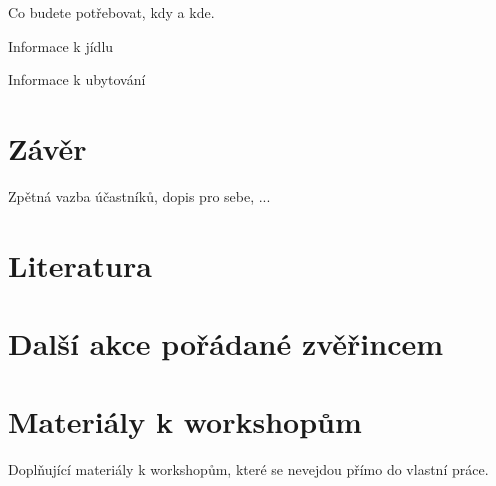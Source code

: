 \documentclass[]{article}
\begin{document}
Co budete potřebovat, kdy a kde.

Informace k jídlu

Informace k ubytování



\pagebreak
\section*{Závěr}

Zpětná vazba účastníků, dopis pro sebe, ...


\pagebreak
\section*{Literatura}

\pagebreak
\appendix
\section*{Další akce pořádané zvěřincem}

\pagebreak
\section*{Materiály k workshopům}

Doplňující materiály k workshopům, které se nevejdou přímo do vlastní práce.
\end{document}
